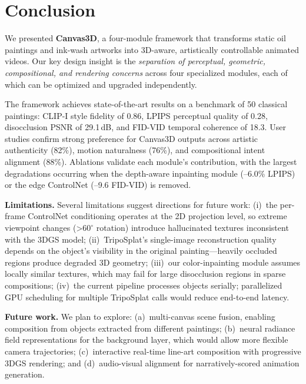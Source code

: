 \section{Conclusion}
\label{sec:conclusion}

We presented \textbf{Canvas3D}, a four-module framework that transforms static
oil paintings and ink-wash artworks into 3D-aware, artistically controllable
animated videos. Our key design insight is the \textit{separation of
perceptual, geometric, compositional, and rendering concerns} across four
specialized modules, each of which can be optimized and upgraded independently.

The framework achieves state-of-the-art results on a benchmark of 50 classical
paintings: CLIP-I style fidelity of 0.86, LPIPS perceptual quality of 0.28,
disocclusion PSNR of 29.1\,dB, and FID-VID temporal coherence of 18.3. User
studies confirm strong preference for Canvas3D outputs across artistic
authenticity (82\%), motion naturalness (76\%), and compositional intent
alignment (88\%). Ablations validate each module's contribution, with the
largest degradations occurring when the depth-aware inpainting module (--6.0\%
LPIPS) or the edge ControlNet (--9.6 FID-VID) is removed.

\smallskip
\noindent\textbf{Limitations.}
Several limitations suggest directions for future work:
(i)~the per-frame ControlNet conditioning operates at the 2D projection level,
so extreme viewpoint changes (>$60^\circ$ rotation) introduce hallucinated
textures inconsistent with the 3DGS model; (ii)~TripoSplat's single-image
reconstruction quality depends on the object's visibility in the original
painting---heavily occluded regions produce degraded 3D geometry;
(iii)~our color-inpainting module assumes locally similar textures, which may
fail for large disocclusion regions in sparse compositions;
(iv)~the current pipeline processes objects serially; parallelized GPU
scheduling for multiple TripoSplat calls would reduce end-to-end latency.

\smallskip
\noindent\textbf{Future work.}
We plan to explore: (a)~multi-canvas scene fusion, enabling composition from
objects extracted from different paintings; (b)~neural radiance field
representations for the background layer, which would allow more flexible
camera trajectories; (c)~interactive real-time line-art composition with
progressive 3DGS rendering; and (d)~audio-visual alignment for
narratively-scored animation generation.

